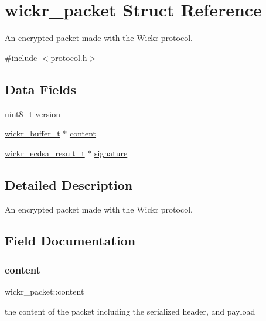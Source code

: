 \hypertarget{structwickr__packet}{}\section{wickr\+\_\+packet Struct Reference}
\label{structwickr__packet}


An encrypted packet made with the Wickr protocol.  




{\ttfamily \#include $<$protocol.\+h$>$}

\subsection*{Data Fields}
\begin{DoxyCompactItemize}
\item 
uint8\+\_\+t \hyperlink{structwickr__packet_a35c17c926c267a603e810b88961c2bf3}{version}
\item 
\hyperlink{structwickr__buffer}{wickr\+\_\+buffer\+\_\+t} $\ast$ \hyperlink{structwickr__packet_a4d17d017c9d0fbb6e748a7ed935e5512}{content}
\item 
\hyperlink{structwickr__ecdsa__result}{wickr\+\_\+ecdsa\+\_\+result\+\_\+t} $\ast$ \hyperlink{structwickr__packet_a8b5e9a4eed6f133ffedd1aa9178b5567}{signature}
\end{DoxyCompactItemize}


\subsection{Detailed Description}
An encrypted packet made with the Wickr protocol. 

\subsection{Field Documentation}
\mbox{\label{structwickr__packet_a4d17d017c9d0fbb6e748a7ed935e5512}} 
\subsubsection{\texorpdfstring{content}{content}}
{\footnotesize\ttfamily wickr\+\_\+packet\+::content}

the content of the packet including the serialized header, and payload \mbox{\label{structwickr__packet_a8b5e9a4eed6f133ffedd1aa9178b5567}} 
